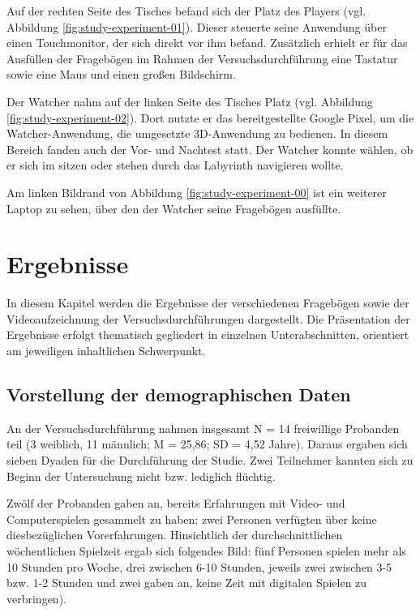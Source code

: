 Auf der rechten Seite des Tisches befand sich der Platz des Players (vgl. Abbildung \ref{fig:study-experiment-01}). Dieser steuerte seine Anwendung über einen Touchmonitor, der sich direkt vor ihm befand. Zusätzlich erhielt er für das Ausfüllen der Fragebögen im Rahmen der Versuchsdurchführung eine Tastatur sowie eine Maus und einen großen Bildschirm.

Der Watcher nahm auf der linken Seite des Tisches Platz (vgl. Abbildung \ref{fig:study-experiment-02}). Dort nutzte er das bereitgestellte Google Pixel, um die Watcher-Anwendung, die umgesetzte \ac{3D}-Anwendung zu bedienen. In diesem Bereich fanden auch der Vor- und Nachtest statt. Der 
Watcher konnte wählen, ob er sich im sitzen oder stehen durch das Labyrinth navigieren wollte.

Am linken Bildrand von Abbildung \ref{fig:study-experiment-00} ist ein weiterer Laptop zu sehen, über den der Watcher seine Fragebögen ausfüllte.

\section{Ergebnisse}

In diesem Kapitel werden die Ergebnisse der verschiedenen Fragebögen sowie der Videoaufzeichnung der Versuchsdurchführungen dargestellt. Die Präsentation der Ergebnisse erfolgt thematisch gegliedert in einzelnen Unterabschnitten, orientiert am jeweiligen inhaltlichen Schwerpunkt.

\subsection{Vorstellung der demographischen Daten}

An der Versuchsdurchführung nahmen insgesamt N = 14 freiwillige Probanden teil (3 weiblich, 11 männlich; M = 25,86; SD = 4,52 Jahre). Daraus ergaben sich sieben Dyaden für die Durchführung der Studie. Zwei Teilnehmer kannten sich zu Beginn der Untersuchung nicht bzw. lediglich flüchtig. 

Zwölf der Probanden gaben an, bereits Erfahrungen mit Video- und Computerspielen gesammelt zu haben; zwei Personen verfügten über keine diesbezüglichen Vorerfahrungen. Hinsichtlich der durchschnittlichen wöchentlichen Spielzeit ergab sich folgendes Bild: fünf Personen spielen mehr als 10 Stunden pro Woche, drei zwischen 6-10 Stunden, jeweils zwei zwischen 3-5 bzw. 1-2 Stunden und zwei gaben an, keine Zeit mit digitalen Spielen zu verbringen).

